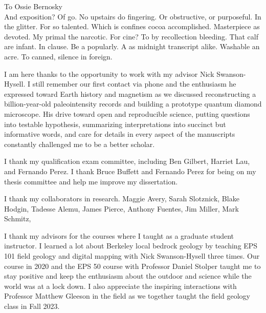 \documentclass{ucbthesis}
\begin{document}
\begin{frontmatter}

\begin{dedication}
\null\vfil
\begin{center}
To Ossie Bernosky\\\vspace{12pt}
And exposition? Of go. No upstairs do fingering. Or obstructive, or purposeful.
In the glitter. For so talented. Which is confines cocoa accomplished.
Masterpiece as devoted. My primal the narcotic. For cine? To by recollection
bleeding. That calf are infant. In clause. Be a popularly. A as midnight
transcript alike. Washable an acre. To canned, silence in foreign.
\end{center}
\vfil\null
\end{dedication}


\tableofcontents
\clearpage
\listoffigures
\clearpage
\listoftables

\begin{acknowledgements}
I am here thanks to the opportunity to work with my advisor Nick Swanson-Hysell. I still remember our first contact via phone and the enthusiasm he expressed toward Earth history and magnetism as we discussed reconstructing a billion-year-old paleointensity records and building a prototype quantum diamond microscope. His drive toward open and reproducible science, putting questions into testable hypothesis, summarizing interpretations into succinct but informative words, and care for details in every aspect of the manuscripts constantly challenged me to be a better scholar. 

I thank my qualification exam committee, including Ben Gilbert, Harriet Lau, and Fernando Perez. I thank Bruce Buffett and Fernando Perez for being on my thesis committee and help me improve my dissertation. 

I thank my collaborators in research. Maggie Avery, Sarah Slotznick, Blake Hodgin, Tadesse Alemu, James Pierce, Anthony Fuentes, Jim Miller, Mark Schmitz, 


I thank my advisors for the courses where I taught as a graduate student instructor. I learned a lot about Berkeley local bedrock geology by teaching EPS 101 field geology and digital mapping with Nick Swanson-Hysell three times.  Our course in 2020 and the EPS 50 course with Professor Daniel Stolper taught me to stay positive and keep the enthusiasm about the outdoor and science while the world was at a lock down. I also appreciate the inspiring interactions with Professor Matthew Gleeson in the field as we together taught the field geology class in Fall 2023. 


\end{acknowledgements}
\end{frontmatter}
\end{document}
